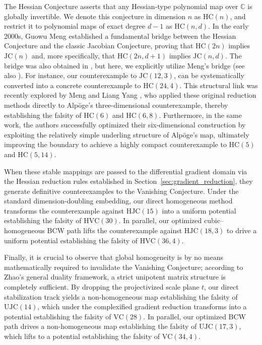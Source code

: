 \documentclass[11pt,a4paper]{article}
\begin{document}
The Hessian Conjecture asserts that any Hessian-type polynomial map over $\mathbb{C}$ is globally invertible. We denote this conjecture in dimension $n$ as $\mathrm{HC}(n)$, and restrict it to polynomial maps of exact degree $d-1$ as $\mathrm{HC}(n,d)$. In the early 2000s, Guowu Meng \cite{meng2005} established a fundamental bridge between the Hessian Conjecture and the classic Jacobian Conjecture, proving that $\mathrm{HC}(2n)$ implies $\mathrm{JC}(n)$ and, more specifically, that $\mathrm{HC}(2n, d+1)$ implies $\mathrm{JC}(n, d)$. The bridge was also obtained in \cite{BE2005}, but here, we explicitly utilize Meng's bridge (see also \cite{B2014}). For instance, our counterexample to $\mathrm{JC}(12,3)$, can be systematically converted into a concrete counterexample to $\mathrm{HC}(24,4)$. This structural link was recently explored by Meng and Liang Yang \cite{mengyang2026}, who applied these original reduction methods directly to Alpöge's three-dimensional counterexample, thereby establishing the falsity of $\mathrm{HC}(6)$ and $\mathrm{HC}(6,8)$. Furthermore, in the same work, the authors successfully optimized their six-dimensional construction by exploiting the relatively simple underling structure of Alpöge's map, ultimately improving the boundary to achieve a highly compact counterexample to $\mathrm{HC}(5)$ and $\mathrm{HC}(5,14)$.

When these stable mappings are passed to the differential gradient domain via the Hessian reduction rules established in Section~\ref{sec:gradient_reduction}, they generate definitive counterexamples to the Vanishing Conjecture. Under the standard dimension-doubling embedding, our direct homogeneous method transforms the counterexample against $\mathrm{HJC}(15)$ into a uniform potential establishing the falsity of $\mathrm{HVC}(30)$. In parallel, our optimized cubic--homogeneous BCW path lifts the counterexample against $\mathrm{HJC}(18,3)$ to drive a uniform potential establishing the falsity of $\mathrm{HVC}(36,4)$.

Finally, it is crucial to observe that global homogeneity is by no means mathematically required to invalidate the Vanishing Conjecture; according to Zhao's general duality framework, a strict unipotent matrix structure is completely sufficient. By dropping the projectivized scale plane $t$, our direct stabilization track yields a non-homogeneous map establishing the falsity of $\mathrm{UJC}(14)$, which under the complexified gradient reduction transforms into a potential establishing the falsity of $\mathrm{VC}(28)$. In parallel, our optimized BCW path drives a non-homogeneous map establishing the falsity of $\mathrm{UJC}(17,3)$, which lifts to a potential establishing the falsity of $\mathrm{VC}(34,4)$.
\end{document}
